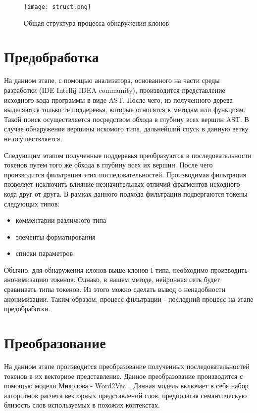 \begin{figure}[htbp]
\centering
\texttt{[image: struct.png]}
\caption{Общая структура процесса обнаружения клонов}
\label{fig:struct}
\end{figure}

\section{Предобработка}

На данном этапе, с помощью анализатора, основанного на части среды разработки (IDE Intellij IDEA community), производится представление исходного кода программы в виде AST. После чего, из полученного дерева выделяются только те поддеревья, которые относятся к методам или функциям. Такой поиск осуществляется посредством обхода в глубину всех вершин AST. В случае обнаружения вершины искомого типа, дальнейший спуск в данную ветку не осуществляется.


Следующим этапом полученные поддеревья преобразуются в последовательности токенов путем того же обхода в глубину всех их вершин. После чего производится фильтрация этих последовательностей. Производимая фильтрация позволяет исключить влияние незначительных отличий фрагментов исходного кода друг от друга. В рамках данного подхода фильтрации подвергаются токены следующих типов:
\begin{itemize}
\setlength\itemsep{0mm}
\item комментарии различного типа
\item элементы форматирования
\item списки параметров
\end{itemize}

Обычно, для обнаружения клонов выше клонов I типа, необходимо производить анонимизацию токенов. Однако, в нашем методе, нейронная сеть будет сравнивать типы токенов. Из этого можно сделать вывод о ненадобности анонимизации. Таким образом, процесс фильтрации - последний процесс на этапе предобработки.

\section{Преобразование}

На данном этапе производится преобразование полученных последовательностей токенов в их векторное представление. Данное преобразование производится с помощью модели Миколова - Word2Vec~\cite{word2vec}. Данная модель включает в себя набор алгоритмов расчета векторных представлений слов, предполагая семантическую близость слов используемых в похожих контекстах.

